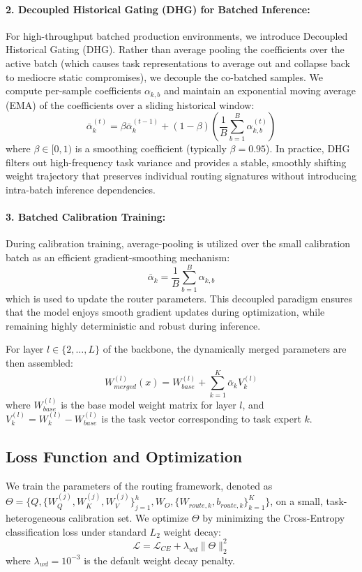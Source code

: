 \paragraph{2. Decoupled Historical Gating (DHG) for Batched Inference:} For high-throughput batched production environments, we introduce Decoupled Historical Gating (DHG). Rather than average pooling the coefficients over the active batch (which causes task representations to average out and collapse back to mediocre static compromises), we decouple the co-batched samples. We compute per-sample coefficients $\alpha_{k, b}$ and maintain an exponential moving average (EMA) of the coefficients over a sliding historical window:
\begin{equation}
    \bar{\alpha}_k^{(t)} = \beta \bar{\alpha}_k^{(t-1)} + (1 - \beta) \left( \frac{1}{B} \sum_{b=1}^B \alpha_{k, b}^{(t)} \right)
\end{equation}
where $\beta \in [0, 1)$ is a smoothing coefficient (typically $\beta = 0.95$). In practice, DHG filters out high-frequency task variance and provides a stable, smoothly shifting weight trajectory that preserves individual routing signatures without introducing intra-batch inference dependencies.

\paragraph{3. Batched Calibration Training:} During calibration training, average-pooling is utilized over the small calibration batch as an efficient gradient-smoothing mechanism:
\begin{equation}
    \bar{\alpha}_k = \frac{1}{B} \sum_{b=1}^B \alpha_{k, b}
\end{equation}
which is used to update the router parameters. This decoupled paradigm ensures that the model enjoys smooth gradient updates during optimization, while remaining highly deterministic and robust during inference.

For layer $l \in \{2, \dots, L\}$ of the backbone, the dynamically merged parameters are then assembled:
\begin{equation}
    W_{merged}^{(l)}(x) = W_{base}^{(l)} + \sum_{k=1}^K \bar{\alpha}_k V_k^{(l)}
\end{equation}
where $W_{base}^{(l)}$ is the base model weight matrix for layer $l$, and $V_k^{(l)} = W_k^{(l)} - W_{base}^{(l)}$ is the task vector corresponding to task expert $k$.

\subsection{Loss Function and Optimization}
We train the parameters of the routing framework, denoted as $\Theta = \{Q, \{W_Q^{(j)}, W_K^{(j)}, W_V^{(j)}\}_{j=1}^h, W_O, \{W_{route, k}, b_{route, k}\}_{k=1}^K\}$, on a small, task-heterogeneous calibration set. We optimize $\Theta$ by minimizing the Cross-Entropy classification loss under standard $L_2$ weight decay:
\begin{equation}
    \mathcal{L} = \mathcal{L}_{CE} + \lambda_{wd} \|\Theta\|_2^2
\end{equation}
where $\lambda_{wd} = 10^{-3}$ is the default weight decay penalty.

